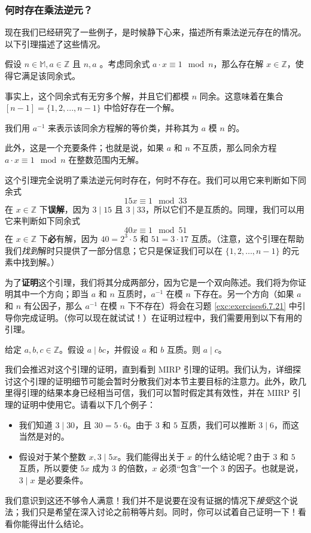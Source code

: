 \subsubsection*{何时存在乘法逆元？}

现在我们已经研究了一些例子，是时候静下心来，描述所有乘法逆元存在的情况。以下引理描述了这些情况。

\begin{lemma}\label{lemma6.5.24}
    假设 $n \in \mathbb{M}, a \in \mathbb{Z}$ 且 $n, a$ 。考虑同余式 $a \cdot x \equiv 1 \mod n$，那么存在解 $x \in \mathbb{Z}$，使得它满足该同余式。

    事实上，这个同余式有无穷多个解，并且它们都模 $n$ 同余。这意味着在集合 $[n - 1] = \{1, 2, ... , n-1\}$ 中恰好存在一个解。

    我们用 $a^{-1}$ 来表示该同余方程解的等价类，并称其为 $a$ 模 $n$ 的。

    此外，这是一个充要条件；也就是说，如果 $a$ 和 $n$ 不互质，那么同余方程 $a \cdot x \equiv 1 \mod n$ 在整数范围内无解。
\end{lemma}

这个引理完全说明了乘法逆元何时存在，何时不存在。我们可以用它来判断如下同余式
\[15x \equiv 1 \mod 33\]
在 $x \in \mathbb{Z}$ 下\textbf{误解}，因为 $3 \mid 15$ 且 $3 \mid 33$，所以它们不是互质的。同理，我们可以用它来判断如下同余式
\[40x \equiv 1 \mod 51\]
在 $x \in \mathbb{Z}$ 下\textbf{必}有解，因为 $40 = 2^3 \cdot 5$ 和 $51 = 3 \cdot 17$ 互质。（注意，这个引理在帮助我们\emph{找到}解时只提供了一部分信息；它只是保证我们可以在 $\{1, 2, \dots , n-1\}$ 的元素中找到解。）

为了\textbf{证明}这个引理，我们将其分成两部分，因为它是一个双向陈述。我们将为你证明其中一个方向；即当 $a$ 和 $n$ 互质时，$a^{-1}$ 在模 $n$ 下存在。另一个方向（如果 $a$ 和 $n$ 有公因子，那么 $a^{-1}$ 在模 $n$ 下不存在）将会在习题 \ref{exc:exercises6.7.21} 中引导你完成证明。（你可以现在就试试！）在证明过程中，我们需要用到以下有用的引理。

\begin{lemma}[欧几里得引理]\label{lemma6.5.25}
    给定 $a, b, c \in \mathbb{Z}$。假设 $a \mid bc$，并假设 $a$ 和 $b$ 互质。则 $a \mid c$。
\end{lemma}

我们会推迟对这个引理的证明，直到看到 MIRP 引理的证明。我们认为，详细探讨这个引理的证明细节可能会暂时分散我们对本节主要目标的注意力。此外，欧几里得引理的结果本身已经相当可信，我们可以暂时假定其有效性，并在 MIRP 引理的证明中使用它。请看以下几个例子：
\begin{itemize}
    \item 我们知道 $3 \mid 30$，且 $30 = 5 \cdot 6$。由于 $3$ 和 $5$ 互质，我们可以推断 $3 \mid 6$，而这当然是对的。
    \item 假设对于某个整数 $x, 3 \mid 5x$。我们能得出关于 $x$ 的什么结论呢？由于 $3$ 和 $5$ 互质，所以要使 $5x$ 成为 $3$ 的倍数，$x$ 必须``包含''一个 $3$ 的因子。也就是说，$3 \mid x$ 是必要条件。
\end{itemize}
我们意识到这还不够令人满意！我们并不是说要在没有证据的情况下\emph{接受}这个说法；我们只是希望在深入讨论之前稍等片刻。同时，你可以试着自己证明一下！看看你能得出什么结论。


